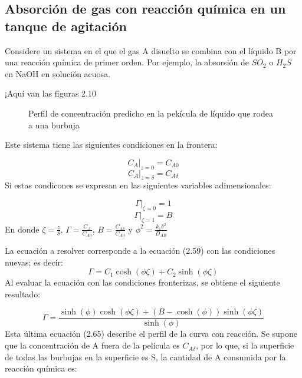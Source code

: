 \subsection{Absorción de gas con reacción química en un tanque de agitación}
Considere un sistema en el que el gas A disuelto se combina con el líquido B por una reacción química de primer orden. Por ejemplo, la absorsión de $SO_2$ o $H_2S$ en NaOH en solución acuosa.

¡Aquí van las figuras 2.10
\begin{figure}
    \centering
    \caption{Perfil de concentración predicho en la pekícula de líquido que rodea a una burbuja}
\end{figure}

Este sistema tiene las siguientes condiciones en la frontera:

\begin{equation}
    C_A|_{z=0}=C_{A0}
\end{equation}
\begin{equation}
    C_A|_{z=\delta}=C_{A\delta}
\end{equation}
Si estas condicones se expresan en las siguientes variables adimensionales:

\begin{equation*}
    \Gamma|_{\zeta=0}=1
\end{equation*}
\begin{equation*}
    \Gamma|_{\zeta=1}=B
\end{equation*}
En donde $\zeta=\frac{z}{\delta}$, $\Gamma=\frac{C_A}{C_{A0}}$, $B=\frac{C_{A\delta}}{C_{A0}}$ y $\phi^2=\frac{k_1\delta^2}{D_{AB}}$

La ecuación a resolver corresponde a la ecuación (2.59) con las condiciones nuevas; es decir:
\begin{equation*}
    \Gamma=C_1\cosh({\phi\zeta})+C_2\sinh({\phi\zeta})
\end{equation*}
Al evaluar la ecuación con las condiciones fronterizas, se obtiene el siguiente resultado:

\begin{equation}
    \Gamma=\frac{\sinh(\phi)\cosh(\phi\zeta)+(B-\cosh(\phi))\sinh(\phi\zeta)}{\sinh(\phi)}
\end{equation}
Esta última ecuación (2.65) describe el perfil de la curva con reacción. Se supone que la concentración de A fuera de la película es $C_{A\delta}$, por lo que, si la superficie de todas las burbujas en la superficie es S, la cantidad de A consumida por la reacción química es:

